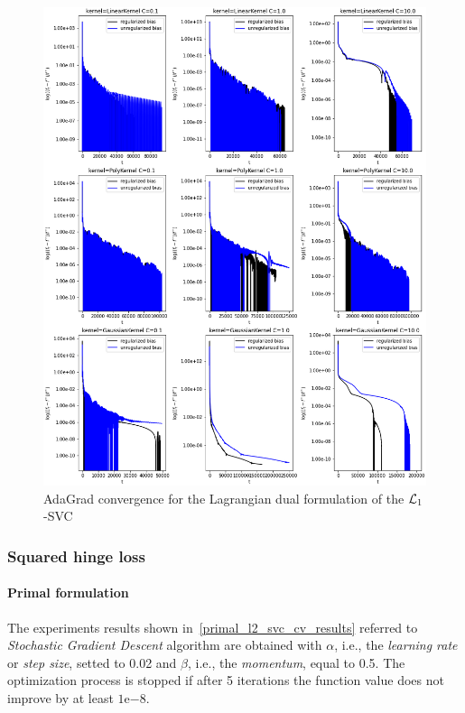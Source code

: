 



\begin{figure}[H]
	\centering
	\includegraphics[scale=0.55]{img/lagrangian_dual_l1_svc_loss_history}
	\caption{AdaGrad convergence for the Lagrangian dual formulation of the $\protect \mathcal{L}_1$-SVC}
	\label{fig:lagrangian_dual_l1_svc_loss_history}
\end{figure}

\pagebreak

\subsubsection{Squared hinge loss}

\paragraph{Primal formulation}

The experiments results shown in~\ref{primal_l2_svc_cv_results} referred to \emph{Stochastic Gradient Descent} algorithm are obtained with $\alpha$, i.e., the \emph{learning rate} or \emph{step size}, setted to 0.02 and $\beta$, i.e., the \emph{momentum}, equal to 0.5. The optimization process is stopped if after 5 iterations the function value does not improve by at least $1\mathrm{e}{-8}$.

